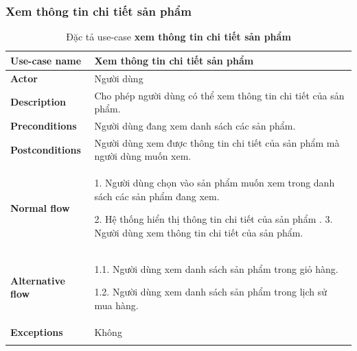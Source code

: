             \subsubsection{Xem thông tin chi tiết sản phẩm } 
            {
\setlength\extrarowheight{6pt}
         \begin{longtable}{| p{} | p{} |} 
    \hline
    \textbf{Use-case name} 
    & 
    Xem thông tin chi tiết sản phẩm
    \\
    \hline
    \textbf{Actor} 
    & 
    Người dùng
    \\
    \hline
    \textbf{Description} 
    & 
    Cho phép người dùng có thể xem thông tin chi tiết của sản phẩm.
    \\
    \hline
    \textbf{Preconditions} 
    &
    Người dùng đang xem danh sách các sản phẩm.
    \\
    \hline
    \textbf{Postconditions} 
    & 
    Người dùng xem được thông tin chi tiết của sản phẩm mà người dùng muốn xem.
    \\
    \hline
    \begin{flushleft}
    \textbf{Normal flow}
    \end{flushleft}
    & 
        1. Người dùng chọn vào sản phẩm muốn xem trong danh sách các sản phẩm đang xem.
        
        2. Hệ thống hiển thị thông tin chi tiết của sản phẩm
        .
        3. Người dùng xem thông tin chi tiết của sản phẩm.
    \\
    \hline
    \textbf{Alternative flow}
    & 
    1.1. Người dùng xem danh sách sản phẩm trong giỏ hàng.
    
    1.2. Người dùng xem danh sách sản phẩm trong lịch sử mua hàng.
    \\
    \hline
    \textbf{Exceptions} 
    &
    Không
    \\
    \hline
    \caption{Đặc tả use-case \textbf{xem thông tin chi tiết sản phẩm}}
    \end{longtable}
            }


